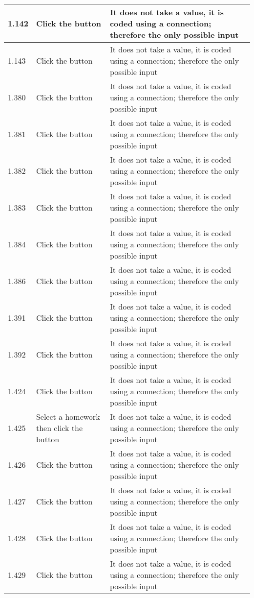 \begin{landscape}
\begin{center}
\begin{longtable}{|p{4cm}|p{4cm}|p{5cm}|}
1.142 & Click the button & It does not take a value, it is coded using a connection; therefore the only possible input \\ \hline
1.143 & Click the button & It does not take a value, it is coded using a connection; therefore the only possible input \\ \hline
1.380 & Click the button & It does not take a value, it is coded using a connection; therefore the only possible input \\ \hline
1.381 & Click the button & It does not take a value, it is coded using a connection; therefore the only possible input \\ \hline
1.382 & Click the button & It does not take a value, it is coded using a connection; therefore the only possible input \\ \hline
1.383 & Click the button & It does not take a value, it is coded using a connection; therefore the only possible input \\ \hline
1.384 & Click the button & It does not take a value, it is coded using a connection; therefore the only possible input \\ \hline
1.386 & Click the button & It does not take a value, it is coded using a connection; therefore the only possible input \\ \hline
1.391 & Click the button & It does not take a value, it is coded using a connection; therefore the only possible input \\ \hline
1.392 & Click the button & It does not take a value, it is coded using a connection; therefore the only possible input \\ \hline
1.424 & Click the button & It does not take a value, it is coded using a connection; therefore the only possible input \\ \hline
1.425 & Select a homework then click the button & It does not take a value, it is coded using a connection; therefore the only possible input \\ \hline
1.426 & Click the button & It does not take a value, it is coded using a connection; therefore the only possible input \\ \hline
1.427 & Click the button & It does not take a value, it is coded using a connection; therefore the only possible input \\ \hline
1.428 & Click the button & It does not take a value, it is coded using a connection; therefore the only possible input \\ \hline
1.429 & Click the button & It does not take a value, it is coded using a connection; therefore the only possible input \\ \hline

\end{longtable}
\end{center}
\end{landscape}
